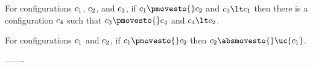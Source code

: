 \noindent
\begin{minipage}{0.65\textwidth}
\begin{lemma}
\label{pre:js:monotonic:lemma}
For configurations $c_1$, $c_2$, and $c_3$, if
$\conf_1\pmovesto{}\conf_2$ and $\conf_3\lt\conf_1$ then there
is a configuration $c_4$ such that $\conf_3\pmovesto{}\conf_4$ and
$\conf_4\lt\conf_2$.
\end{lemma}
\end{minipage}
\hfill%
\begin{minipage}{0.3\textwidth}
\end{minipage}


\begin{lemma}
\label{backwards:implies:forwards:lemma}
For configurations $c_1$ and $c_2$, if $\conf_1\pmovesto{}\conf_2$
then $\conf_2\absmovesto{}\uc{\conf_1}$.
\end{lemma}


-------


